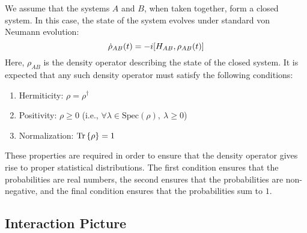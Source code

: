 \documentclass[aps, prl, preprint]{revtex4-1}
\newcommand{\Tra}[1]{\Tr\left\{#1\right\}}
\begin{document}
We assume that the systems $A$ and $B$, when taken together, form a closed system. In this case, the state of the system evolves under standard von Neumann evolution:
\begin{equation}\label{vnAB}
\dot{\rho}_{AB}(t) = -i\comm{H_{AB}}{\rho_{AB}(t)}
\end{equation}
Here, $\rho_{AB}$ is the density operator describing the state of the closed system. It is expected that any such density operator must satisfy the following conditions:
\begin{enumerate}
	\item Hermiticity: $\rho = \rho^{\dag}$
	\item Positivity: $\rho \geq 0$ (i.e., $\forall \lambda\in \text{Spec}(\rho),\ \lambda \geq 0$)
	\item Normalization: $\Tra{\rho} = 1$
\end{enumerate}
These properties are required in order to ensure that the density operator gives rise to proper statistical distributions. The first condition ensures that the probabilities are real numbers, the second ensures that the probabilities are non-negative, and the final condition ensures that the probabilities sum to $1$.

\subsection{Interaction Picture}
\end{document}
